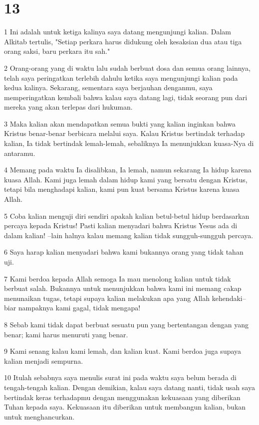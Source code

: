 \chapter{13}

\par 1 Ini adalah untuk ketiga kalinya saya datang mengunjungi kalian. Dalam Alkitab tertulis, "Setiap perkara harus didukung oleh kesaksian dua atau tiga orang saksi, baru perkara itu sah."
\par 2 Orang-orang yang di waktu lalu sudah berbuat dosa dan semua orang lainnya, telah saya peringatkan terlebih dahulu ketika saya mengunjungi kalian pada kedua kalinya. Sekarang, sementara saya berjauhan denganmu, saya memperingatkan kembali bahwa kalau saya datang lagi, tidak seorang pun dari mereka yang akan terlepas dari hukuman.
\par 3 Maka kalian akan mendapatkan semua bukti yang kalian inginkan bahwa Kristus benar-benar berbicara melalui saya. Kalau Kristus bertindak terhadap kalian, Ia tidak bertindak lemah-lemah, sebaliknya Ia menunjukkan kuasa-Nya di antaramu.
\par 4 Memang pada waktu Ia disalibkan, Ia lemah, namun sekarang Ia hidup karena kuasa Allah. Kami juga lemah dalam hidup kami yang bersatu dengan Kristus, tetapi bila menghadapi kalian, kami pun kuat bersama Kristus karena kuasa Allah.
\par 5 Coba kalian menguji diri sendiri apakah kalian betul-betul hidup berdasarkan percaya kepada Kristus! Pasti kalian menyadari bahwa Kristus Yesus ada di dalam kalian! --lain halnya kalau memang kalian tidak sungguh-sungguh percaya.
\par 6 Saya harap kalian menyadari bahwa kami bukannya orang yang tidak tahan uji.
\par 7 Kami berdoa kepada Allah semoga Ia mau menolong kalian untuk tidak berbuat salah. Bukannya untuk menunjukkan bahwa kami ini memang cakap menunaikan tugas, tetapi supaya kalian melakukan apa yang Allah kehendaki--biar nampaknya kami gagal, tidak mengapa!
\par 8 Sebab kami tidak dapat berbuat sesuatu pun yang bertentangan dengan yang benar; kami harus menuruti yang benar.
\par 9 Kami senang kalau kami lemah, dan kalian kuat. Kami berdoa juga supaya kalian menjadi sempurna.
\par 10 Itulah sebabnya saya menulis surat ini pada waktu saya belum berada di tengah-tengah kalian. Dengan demikian, kalau saya datang nanti, tidak usah saya bertindak keras terhadapmu dengan menggunakan kekuasaan yang diberikan Tuhan kepada saya. Kekuasaan itu diberikan untuk membangun kalian, bukan untuk menghancurkan.
